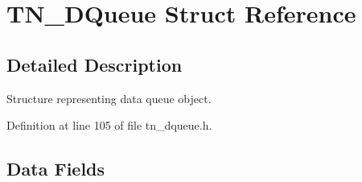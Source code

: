 \hypertarget{structTN__DQueue}{\section{T\+N\+\_\+\+D\+Queue Struct Reference}
\label{structTN__DQueue}
}


\subsection{Detailed Description}
Structure representing data queue object. 

Definition at line 105 of file tn\+\_\+dqueue.\+h.

\subsection*{Data Fields}

